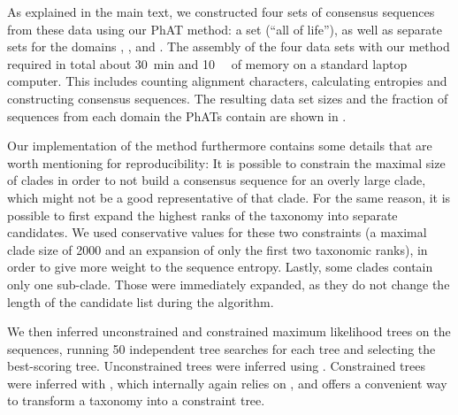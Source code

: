 

As explained in the main text, we constructed four sets of consensus sequences from these data using our \ac{PhAT} method:
a  set (``all of life''),
as well as separate sets for the domains , , and .
The assembly of the four data sets with our method required in total
about \SI{30}{\minute} and \SI{10}{\giga\byte} of memory on a standard laptop computer.
This includes counting alignment characters, calculating entropies and constructing consensus sequences.
The resulting data set sizes and the fraction of sequences from each domain the \acp{PhAT} contain
are shown in .

Our implementation of the method furthermore contains some details that are worth mentioning for reproducibility:
It is possible to constrain the maximal size of clades
in order to not build a consensus sequence for an overly large clade,
which might not be a good representative of that clade.
For the same reason, it is possible to first expand the highest ranks of the taxonomy into separate candidates.
We used conservative values for these two constraints
(a maximal clade size of \num{2 000} and an expansion of only the first two taxonomic ranks),
in order to give more weight to the sequence entropy.
Lastly, some clades contain only one sub-clade.
Those were immediately expanded, as they do not change the length of the candidate list during the algorithm.

We then inferred unconstrained and constrained maximum likelihood trees on the sequences,
running 50 independent tree searches for each tree and selecting the best-scoring tree.
Unconstrained trees were inferred using  \citep{Stamatakis2014}.
Constrained trees were inferred with  \citep{Kozlov2016},
which internally again relies on ,
and offers a convenient way to transform a taxonomy into a constraint tree.


